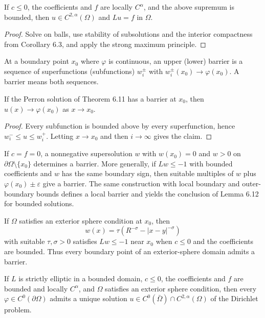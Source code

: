 \begin{theorem}
\label{gt-ch06-thm-6-11}
If $c\le0$, the coefficients and $f$ are locally $C^\alpha$, and the above
supremum is bounded, then $u\in C^{2,\alpha}(\Omega)$ and $Lu=f$ in $\Omega$.
\end{theorem}
\begin{proof}
\sketch Solve on balls, use stability of subsolutions and the interior compactness
from Corollary 6.3, and apply the strong maximum principle.
\end{proof}

At a boundary point $x_0$ where $\varphi$ is continuous, an upper (lower)
barrier is a sequence of superfunctions (subfunctions) $w_i^\pm$ with
$w_i^\pm(x_0)\to\varphi(x_0)$.  A barrier means both sequences.

\begin{lemma}
\label{gt-ch06-lem-6-12}
If the Perron solution of Theorem 6.11 has a barrier at $x_0$, then
$u(x)\to\varphi(x_0)$ as $x\to x_0$.
\end{lemma}
\begin{proof}
\sketch Every subfunction is bounded above by every superfunction, hence
$w_i^-\le u\le w_i^+$.  Letting $x\to x_0$ and then $i\to\infty$ gives the claim.
\end{proof}

If $c=f=0$, a nonnegative supersolution $w$ with $w(x_0)=0$ and
$w>0$ on $\partial\Omega\setminus\{x_0\}$ determines a barrier.  More generally,
if $Lw\le-1$ with bounded coefficients and $w$ has the same boundary sign,
then suitable multiples of $w$ plus $\varphi(x_0)\pm\varepsilon$ give a barrier.
The same construction with local boundary and outer-boundary bounds defines a
local barrier and yields the conclusion of Lemma 6.12 for bounded solutions.

If $\Omega$ satisfies an exterior sphere condition at $x_0$, then
\begin{equation}\tag{6.45}
w(x)=\tau(R^{-\sigma}-|x-y|^{-\sigma})
\end{equation}
with suitable $\tau,\sigma>0$ satisfies $Lw\le-1$ near $x_0$ when $c\le0$ and
the coefficients are bounded.  Thus every boundary point of an exterior-sphere
domain admits a barrier.

\begin{theorem}
\label{gt-ch06-thm-6-13}
If $L$ is strictly elliptic in a bounded domain, $c\le0$, the coefficients and
$f$ are bounded and locally $C^\alpha$, and $\Omega$ satisfies an exterior
sphere condition, then every $\varphi\in C^0(\partial\Omega)$ admits a unique
solution $u\in C^0(\bar\Omega)\cap C^{2,\alpha}(\Omega)$ of the Dirichlet problem.
\end{theorem}

